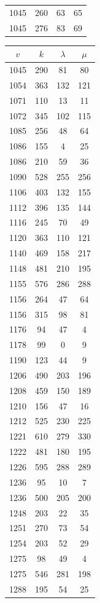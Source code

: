 \documentclass[12pt]{amsproc} %
\theoremstyle{definition}\newtheorem{defn}[thm]{Definition}
\theoremstyle{definition}\newtheorem{rem}[thm]{Remark}
\theoremstyle{definition}\newtheorem{ex}[thm]{Example}
\begin{document}
\begin{table}[ht]
\begin{minipage}{0.25\textwidth}
\begin{tabular}{c|c|c|c}
		1045 & 260 & 63 & 65 \\ 
		1045 & 276 & 83 & 69 \\
        \end{tabular}
        \vspace{0.47cm}
    \end{minipage}
    \hfill
    \begin{minipage}{0.25\textwidth}
        \centering
        \begin{tabular}{c|c|c|c}
            $v$ & $k$ & $\lambda$ & $\mu$ \\ 
            \hline
		1045 & 290 & 81 & 80 \\ 
		1054 & 363 & 132 & 121 \\ 
		1071 & 110 & 13 & 11 \\ 
		1072 & 345 & 102 & 115 \\ 
		1085 & 256 & 48 & 64 \\ 
		1086 & 155 & 4 & 25 \\ 
		1086 & 210 & 59 & 36 \\ 
		1090 & 528 & 255 & 256 \\ 
		1106 & 403 & 132 & 155 \\ 
		1112 & 396 & 135 & 144 \\ 
		1116 & 245 & 70 & 49 \\ 
		1120 & 363 & 110 & 121 \\ 
		1140 & 469 & 158 & 217 \\ 
		1148 & 481 & 210 & 195 \\ 
		1155 & 576 & 286 & 288 \\ 
		1156 & 264 & 47 & 64 \\ 
		1156 & 315 & 98 & 81 \\ 
		1176 & 94 & 47 & 4 \\ 
		1178 & 99 & 0 & 9 \\ 
		1190 & 123 & 44 & 9 \\ 
		1206 & 490 & 203 & 196 \\ 
		1208 & 459 & 150 & 189 \\ 
		1210 & 156 & 47 & 16 \\ 
		1212 & 525 & 230 & 225 \\ 
		1221 & 610 & 279 & 330 \\ 
		1222 & 481 & 180 & 195 \\ 
		1226 & 595 & 288 & 289 \\ 
		1236 & 95 & 10 & 7 \\ 
		1236 & 500 & 205 & 200 \\ 
		1248 & 203 & 22 & 35 \\ 
		1251 & 270 & 73 & 54 \\ 
		1254 & 203 & 52 & 29 \\ 
		1275 & 98 & 49 & 4 \\ 
		1275 & 546 & 281 & 198 \\ 
		1288 & 195 & 54 & 25 \\
        \end{tabular}
        \vspace{0.47cm}
    \end{minipage}
\end{table}
\end{document}
